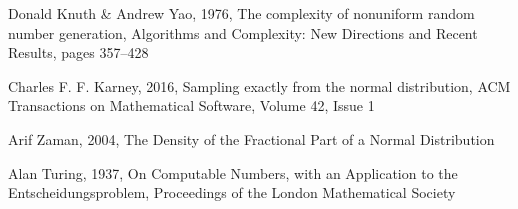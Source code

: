 \begin{thebibliography}{9}
Donald Knuth \& Andrew Yao, 1976, The complexity of nonuniform random number generation, Algorithms and
Complexity: New Directions and Recent Results, pages 357–428

Charles F. F. Karney, 2016, Sampling exactly from the normal distribution, ACM Transactions on Mathematical Software, Volume 42, Issue 1

Arif Zaman, 2004, The Density of the Fractional Part of a Normal Distribution

Alan Turing, 1937, On Computable Numbers, with an Application to the Entscheidungsproblem, Proceedings of the London Mathematical Society
\end{thebibliography}